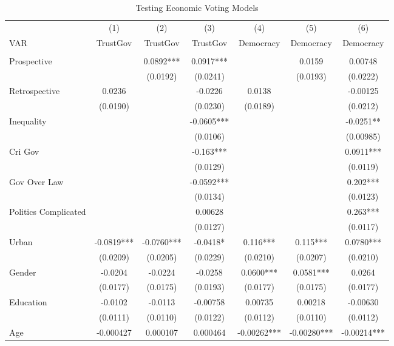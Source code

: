 \documentclass[12pt]{article}\usepackage[]{graphicx}\usepackage[]{color}
\begin{document}
\begin{table}[htbp]
	\centering
	\caption{\label{evaluation}Testing Economic Voting Models}
	\begin{tabular}{lcccccc}
		\hline
		& (1)    & (2)    & (3)   & (4)  & (5)  & (6) \\
	
		VAR & TrustGov & TrustGov & TrustGov & Democracy & Democracy &Democracy \\
		&       &       &       &       &       &  \\
		\hline
		Prospective &       & 0.0892*** & 0.0917*** &       & 0.0159 & 0.00748 \\
		&       & (0.0192) & (0.0241) &       & (0.0193) & (0.0222) \\
		Retrospective & 0.0236 &       & -0.0226 & 0.0138 &       & -0.00125 \\
		& (0.0190) &       & (0.0230) & (0.0189) &       & (0.0212) \\
		Inequality &       &       & -0.0605*** &       &       & -0.0251** \\
		&       &       & (0.0106) &       &       & (0.00985) \\
		Cri Gov &       &       & -0.163*** &       &       & 0.0911*** \\
		&       &       & (0.0129) &       &       & (0.0119) \\
		Gov Over Law &       &       & -0.0592*** &       &       & 0.202*** \\
		&       &       & (0.0134) &       &       & (0.0123) \\
		Politics Complicated &       &       & 0.00628 &       &       & 0.263*** \\
		&       &       & (0.0127) &       &       & (0.0117) \\
		Urban & -0.0819*** & -0.0760*** & -0.0418* & 0.116*** & 0.115*** & 0.0780*** \\
		& (0.0209) & (0.0205) & (0.0229) & (0.0210) & (0.0207) & (0.0210) \\
		Gender & -0.0204 & -0.0224 & -0.0258 & 0.0600*** & 0.0581*** & 0.0264 \\
		& (0.0177) & (0.0175) & (0.0193) & (0.0177) & (0.0175) & (0.0177) \\
		Education & -0.0102 & -0.0113 & -0.00758 & 0.00735 & 0.00218 & -0.00630 \\
		& (0.0111) & (0.0110) & (0.0122) & (0.0112) & (0.0110) & (0.0112) \\
		Age   & -0.000427 & 0.000107 & 0.000464 & -0.00262*** & -0.00280*** & -0.00214*** \\

\end{tabular}
\end{table}
\end{document}
